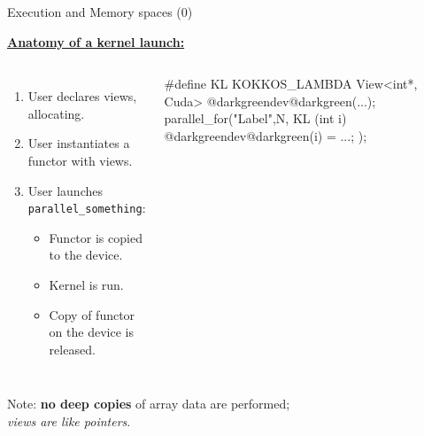 \ifmedium
\begin{frame}[fragile]{Execution and Memory spaces (0)}

  \ul{\textbf{Anatomy of a kernel launch:}}

  \vspace{-10pt}

  \begin{columns}[t,onlytextwidth]


      \begin{enumerate}
        \item{User declares views, allocating.}
        \item{User instantiates a functor with views.}
        \item{User launches \texttt{parallel\_something}:}
        \begin{itemize}
          \item{Functor is copied to the device.}
          \item{Kernel is run.}
          \item{Copy of functor on the device is released.}
        \end{itemize}
      \end{enumerate}


      \vspace{10pt}

      \begin{code}[keywords={}]
#define KL KOKKOS_LAMBDA
View<int*, Cuda> @darkgreendev@darkgreen(...);
parallel_for("Label",N,
  KL (int i) {
    @darkgreendev@darkgreen(i) = ...;
  });
      \end{code}

      \vspace{20pt}

  \end{columns}

  \vspace{20pt}

  Note: \textbf{no deep copies} of array data are performed; \\
    \hspace{30pt}\emph{views are like pointers}.

\end{frame}
\fi


